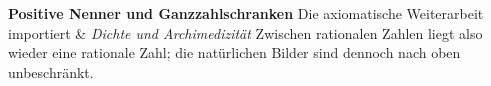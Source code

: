 \begin{BandUebersicht}
\textbf{Positive Nenner und Ganzzahlschranken}
Die axiomatische Weiterarbeit importiert
&
\textit{Dichte und Archimedizität}
Zwischen rationalen Zahlen liegt also wieder eine rationale Zahl;
die natürlichen Bilder sind dennoch nach oben unbeschränkt.
\\
\end{BandUebersicht}
